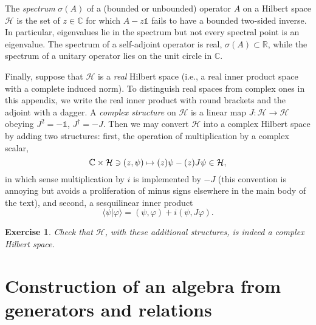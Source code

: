 \documentclass[12pt,a4paper]{article}
\let\Re\relax
\let\Im\relax
\DeclareMathOperator{\Re}{Re}
\DeclareMathOperator{\Im}{Im}
\newcommand{\1}{\mathds{1}}                         %
\newcommand{\RR}{\mathbb{R}}           %
\newcommand{\CC}{\mathbb{C}}           %
\newcommand{\HH}{{\mathcal{H}}}
\newcommand{\II}{{\mathbb{1}}}
\newcommand{\ip}[2]{\langle #1|#2\rangle}
\newtheorem{exercise}[theorem]{Exercise}
\begin{document}
The \emph{spectrum} $\sigma(A)$ of a (bounded or unbounded) operator $A$ on a Hilbert space $\HH$ is the set of $z\in\CC$ for which $A-z\II$ fails to have a bounded two-sided inverse. 
In particular, eigenvalues lie in the spectrum but not every spectral point is an eigenvalue.
The spectrum of a self-adjoint operator is real, $\sigma(A)\subset\RR$, while the spectrum of a unitary operator lies on the unit circle in $\CC$.  

Finally, suppose that $\HH$ is a \emph{real} Hilbert space (i.e., a real inner product space with a complete induced norm). To distinguish real spaces from complex ones in this appendix, we write the real inner product with round brackets and the adjoint with a dagger. 
A \emph{complex structure} on $\HH$ is a linear map $J:\HH\to \HH$ obeying $J^2 = -\II$, $J^\dagger = -J$. Then we may convert $\HH$ into a complex Hilbert space by adding two structures: first, the operation of
multiplication by a complex scalar,
\[
\CC\times\HH\owns (z,\psi)\mapsto  (\Re z)\psi - (\Im z)J\psi \in\HH ,
\]
in which sense multiplication by $i$ is implemented by $-J$ (this convention is annoying but avoids a proliferation of minus signs elsewhere in the main body of the text), and second, 
a sesquilinear inner product
\[
\ip{\psi}{\varphi} = (\psi,\varphi) + i(\psi,J\varphi).
\]
\begin{exercise}
	Check that $\HH$, with these additional structures, is indeed a complex Hilbert space.
\end{exercise} 

\section{Construction of an algebra from generators and relations} \label{appx:presentation}
\end{document}
